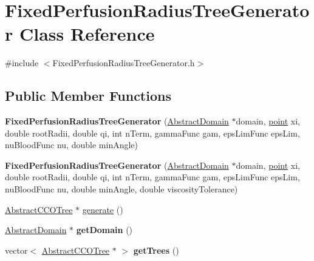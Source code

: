 \hypertarget{class_fixed_perfusion_radius_tree_generator}{}\section{Fixed\+Perfusion\+Radius\+Tree\+Generator Class Reference}
\label{class_fixed_perfusion_radius_tree_generator}


{\ttfamily \#include $<$Fixed\+Perfusion\+Radius\+Tree\+Generator.\+h$>$}

\subsection*{Public Member Functions}
\begin{DoxyCompactItemize}
\item 
\mbox{\label{class_fixed_perfusion_radius_tree_generator_a8abdb4d710719dc724117a51fb6535f2}} 
{\bfseries Fixed\+Perfusion\+Radius\+Tree\+Generator} (\mbox{\hyperlink{class_abstract_domain}{Abstract\+Domain}} $\ast$domain, \mbox{\hyperlink{structpoint}{point}} xi, double root\+Radii, double qi, int n\+Term, gamma\+Func gam, eps\+Lim\+Func eps\+Lim, nu\+Blood\+Func nu, double min\+Angle)
\item 
\mbox{\label{class_fixed_perfusion_radius_tree_generator_ac29647817d59ec24f8c61afbec4e4c68}} 
{\bfseries Fixed\+Perfusion\+Radius\+Tree\+Generator} (\mbox{\hyperlink{class_abstract_domain}{Abstract\+Domain}} $\ast$domain, \mbox{\hyperlink{structpoint}{point}} xi, double root\+Radii, double qi, int n\+Term, gamma\+Func gam, eps\+Lim\+Func eps\+Lim, nu\+Blood\+Func nu, double min\+Angle, double viscosity\+Tolerance)
\item 
\mbox{\hyperlink{class_abstract_c_c_o_tree}{Abstract\+C\+C\+O\+Tree}} $\ast$ \mbox{\hyperlink{class_fixed_perfusion_radius_tree_generator_a628386a3210abbfe8a67417a33d31387}{generate}} ()
\item 
\mbox{\label{class_fixed_perfusion_radius_tree_generator_ab5f60bf11b980a83faccdd3a667c6bf0}} 
\mbox{\hyperlink{class_abstract_domain}{Abstract\+Domain}} $\ast$ {\bfseries get\+Domain} ()
\item 
\mbox{\label{class_fixed_perfusion_radius_tree_generator_a7923e095a700607c5d9e46bc3ef6d93e}} 
vector$<$ \mbox{\hyperlink{class_abstract_c_c_o_tree}{Abstract\+C\+C\+O\+Tree}} $\ast$ $>$ {\bfseries get\+Trees} ()
\end{DoxyCompactItemize}
